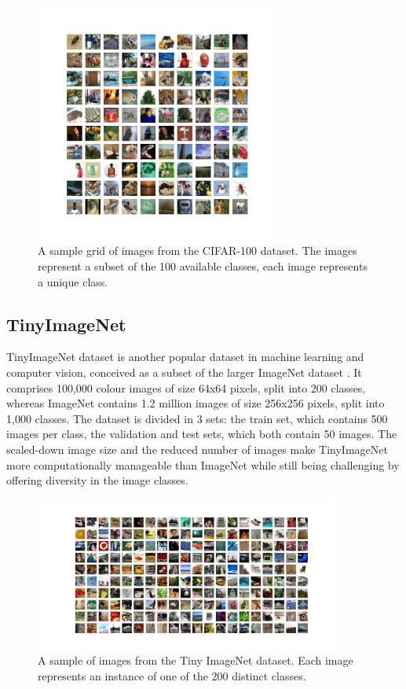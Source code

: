 \begin{figure}[ht!]
  \centering
  \includegraphics[width=0.7\textwidth]{chapter_dlo/assets/cifar-100_example.png}
  \caption{A sample grid of images from the CIFAR-100 dataset. The images
    represent a subset of the 100 available classes, each image represents
    a unique class.}
  \label{fig:intro:cifar100_examples}
\end{figure}


\subsection{TinyImageNet}

TinyImageNet dataset is another popular dataset in machine learning and computer
vision, conceived as a subset of the larger ImageNet dataset
\cite{DBLP:journals/ijcv/RussakovskyDSKS15}. It comprises 100,000 colour images
of size 64x64 pixels, split into 200 classes, whereas ImageNet contains 1.2
million images of size 256x256 pixels, split into 1,000 classes. The dataset is
divided in 3 sets: the train set, which contains 500 images per class, the
validation and test sets, which both contain 50 images. The scaled-down image
size and the reduced number of images make TinyImageNet more computationally
manageable than ImageNet while still being challenging by offering diversity in
the image classes.\\


\begin{figure}[ht!]
  \centering
  \includegraphics[width=0.9\textwidth]{chapter_dlo/assets/tinyimagenet_example.png}
  \caption{A sample of images from the Tiny ImageNet dataset. Each image
    represents an instance of one of the  200 distinct classes.}
  \label{fig:intro:tinyimagenet_examples}
\end{figure}

